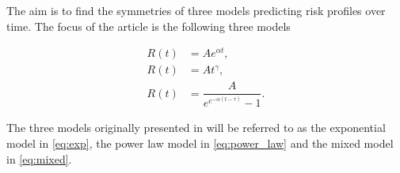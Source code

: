 The aim is to find the symmetries of three models predicting risk profiles over time. The focus of the article is the following three models

\begin{align}
R(t)&=Ae^{\alpha t},\label{eq:exp}\\
R(t)&=At^{\gamma},\label{eq:power_law}\\
R(t)&=\dfrac{A}{e^{e^{-\alpha(t-\tau)}}-1}.\label{eq:mixed}
\end{align}


The three models originally presented in \cite{Palmer1883} will be referred to as the exponential model in \eqref{eq:exp}, the power law model in \eqref{eq:power_law} and the mixed model in \eqref{eq:mixed}. 